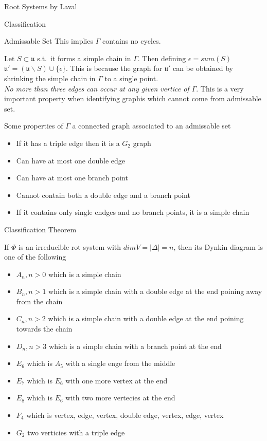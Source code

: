 \documentclass[12pt, letterpaper]{article}
\begin{document}
\begin{section}{Root Systems by Laval}
\begin{subsection}{Classification}
\begin{subsubsection}{Admissable Set}
      This implies \(\Gamma\) contains no cycles.

      Let \(S \subset \mathfrak{u}\) s.t.\ it forms a simple chain in
      \(\Gamma\). Then defining \(\epsilon = sum(S)\) \(\mathfrak{u}' =
      (\mathfrak{u} \backslash S) \cup \{\epsilon\}\). This is because the
      graph for \(\mathfrak{u}'\) can be obtained by shrinking the simple
      chain in \(\Gamma\) to a single point.\\
      \emph{No more than three edges can occur at any given vertice of
        \(\Gamma\)}. This is a very important property when identifying
      graphis which cannot come from admissable set.

      Some properties of \(\Gamma\) a connected graph associated to an
      admissable set
      \begin{itemize}
        \item If it has a triple edge then it is a \(G_{2}\) graph
        \item Can have at most one double edge
        \item Can have at most one branch point
        \item Cannot contain both a double edge and a branch point
        \item If it contains only single endges and no branch points, it is a
              simple chain
      \end{itemize}

    \end{subsubsection}

    \begin{subsubsection}{Classification Theorem}

      If \(\Phi\) is an irreducible rot system with \(dim V =
      | \Delta | = n\), then its Dynkin diagram is one of the following
      \begin{itemize}
        \item \(A_{n}, n > 0\) which is a simple chain
        \item \(B_{n}, n > 1\) which is a simple chain with a double edge at
              the end poining away from the chain
        \item \(C_{n}, n > 2\) which is a simple chain with a double edge at
              the end poining towards the chain
        \item \(D_{n}, n > 3\) which is a simple chain with a branch point at
              the end
        \item \(E_{6}\) which is \(A_{5}\) with a single enge from the middle
        \item \(E_{7}\) which is \(E_{6}\) with one more vertex at the end
        \item \(E_{8}\) which is \(E_{6}\) with two more vertecies at the end
        \item \(F_{4}\) which is vertex, edge, vertex, double edge, vertex,
              edge, vertex
        \item \(G_{2}\) two verticies with a triple edge
      \end{itemize}


\end{subsubsection}
\end{subsection}
\end{section}
\end{document}
